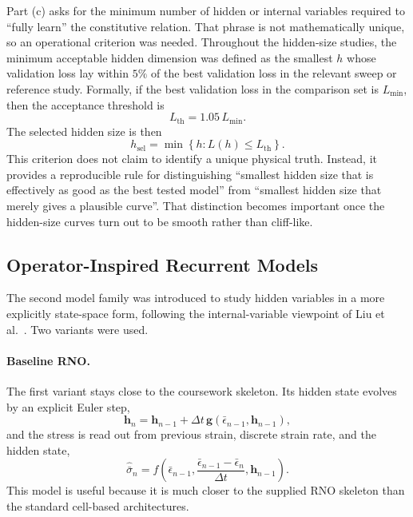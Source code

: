 \documentclass[11pt,a4paper]{article}
\newcommand{\epsbar}{\bar{\epsilon}}
\newcommand{\sigbar}{\bar{\sigma}}
\newcommand{\dt}{\Delta t}
\begin{document}
Part (c) asks for the minimum number of hidden or internal variables required to ``fully learn'' the constitutive relation. That phrase is not mathematically unique, so an operational criterion was needed. Throughout the hidden-size studies, the minimum acceptable hidden dimension was defined as the smallest $h$ whose validation loss lay within $5\%$ of the best validation loss in the relevant sweep or reference study. Formally, if the best validation loss in the comparison set is $L_{\min}$, then the acceptance threshold is
\begin{equation}
L_{\mathrm{th}}=1.05\,L_{\min}.
\label{eq:threshold_definition}
\end{equation}
The selected hidden size is then
\begin{equation}
h_{\mathrm{sel}}=\min\left\{h: L(h)\leq L_{\mathrm{th}}\right\}.
\label{eq:hidden_selection_rule}
\end{equation}
This criterion does not claim to identify a unique physical truth. Instead, it provides a reproducible rule for distinguishing ``smallest hidden size that is effectively as good as the best tested model'' from ``smallest hidden size that merely gives a plausible curve''. That distinction becomes important once the hidden-size curves turn out to be smooth rather than cliff-like.

\FloatBarrier
\subsection{Operator-Inspired Recurrent Models}

The second model family was introduced to study hidden variables in a more explicitly state-space form, following the internal-variable viewpoint of Liu et al.~\cite{Liu_2023}. Two variants were used.

\paragraph{Baseline RNO.}
The first variant stays close to the coursework skeleton. Its hidden state evolves by an explicit Euler step,
\begin{equation}
\bm{h}_n=\bm{h}_{n-1}+\dt\,\bm{g}\!\left(\epsbar_{n-1},\bm{h}_{n-1}\right),
\label{eq:baseline_state_update}
\end{equation}
and the stress is read out from previous strain, discrete strain rate, and the hidden state,
\begin{equation}
\hat{\sigbar}_n=f\!\left(\epsbar_{n-1},\frac{\epsbar_{n-1}-\epsbar_n}{\dt},\bm{h}_{n-1}\right).
\label{eq:baseline_readout}
\end{equation}
This model is useful because it is much closer to the supplied RNO skeleton than the standard cell-based architectures.
\end{document}
